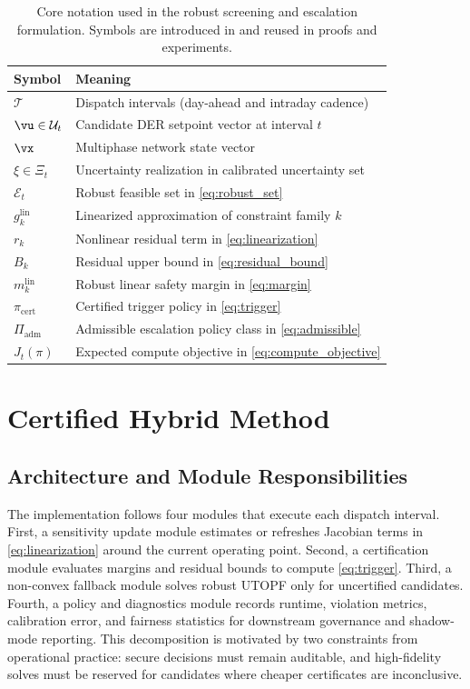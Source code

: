 \documentclass{article} %
\begin{document}
\begin{table}[t]
\caption{Core notation used in the robust screening and escalation formulation. Symbols are introduced in  and reused in proofs and experiments.}
\label{tab:notation}
\centering
\small
\renewcommand{\arraystretch}{1.1}
\setlength{\tabcolsep}{4pt}
\begin{tabular}{ll}
\hline
Symbol & Meaning \\
\hline
$\mathcal{T}$ & Dispatch intervals (day-ahead and intraday cadence) \\
$\vu \in \mathcal{U}_t$ & Candidate DER setpoint vector at interval $t$ \\
$\vx$ & Multiphase network state vector \\
$\xi \in \Xi_t$ & Uncertainty realization in calibrated uncertainty set \\
$\mathcal{E}_t$ & Robust feasible set in \eqref{eq:robust_set} \\
$g_k^{\mathrm{lin}}$ & Linearized approximation of constraint family $k$ \\
$r_k$ & Nonlinear residual term in \eqref{eq:linearization} \\
$B_k$ & Residual upper bound in \eqref{eq:residual_bound} \\
$m_k^{\mathrm{lin}}$ & Robust linear safety margin in \eqref{eq:margin} \\
$\pi_{\mathrm{cert}}$ & Certified trigger policy in \eqref{eq:trigger} \\
$\Pi_{\mathrm{adm}}$ & Admissible escalation policy class in \eqref{eq:admissible} \\
$J_t(\pi)$ & Expected compute objective in \eqref{eq:compute_objective} \\
\hline
\end{tabular}
\end{table}

\section{Certified Hybrid Method}
\label{sec:method}
\subsection{Architecture and Module Responsibilities}
The implementation follows four modules that execute each dispatch interval. First, a sensitivity update module estimates or refreshes Jacobian terms in \eqref{eq:linearization} around the current operating point. Second, a certification module evaluates margins and residual bounds to compute \eqref{eq:trigger}. Third, a non-convex fallback module solves robust UTOPF only for uncertified candidates. Fourth, a policy and diagnostics module records runtime, violation metrics, calibration error, and fairness statistics for downstream governance and shadow-mode reporting. This decomposition is motivated by two constraints from operational practice: secure decisions must remain auditable, and high-fidelity solves must be reserved for candidates where cheaper certificates are inconclusive.
\end{document}
